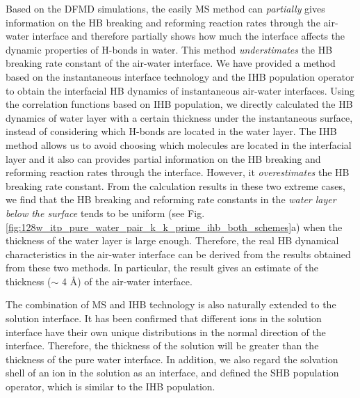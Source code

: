Based on the DFMD simulations, the easily MS method %
can \emph{partially} gives information on the HB breaking and reforming reaction
rates through the air-water interface and therefore partially shows how much the interface affects the dynamic properties of H-bonds in water. 
This method \emph{understimates} the HB breaking rate constant of the air-water interface. 
We have provided a method based on the instantaneous interface technology and the
IHB population operator to obtain the interfacial HB dynamics of instantaneous air-water interfaces.  
Using the correlation functions based on IHB population, we directly calculated the HB dynamics of water layer with a certain thickness 
under the instantaneous surface, instead of considering which H-bonds are located in the water layer. 
The IHB method allows us to avoid choosing which molecules are located in the interfacial layer and
it also can provides partial information on the HB breaking and reforming reaction rates through the interface. 
However, it \emph{overestimates} the HB breaking rate constant. From the calculation results in these two extreme cases, 
we find that the HB breaking and reforming rate constants in the \emph{water layer below the surface} tends to be uniform 
(see Fig.\ref{fig:128w_itp_pure_water_pair_k_k_prime_ihb_both_schemes}a) 
when the thickness of the water layer is large enough. Therefore, the real HB dynamical characteristics in the air-water interface 
can be derived from the results obtained from these two methods. 
In particular, the result gives an estimate of the thickness ($\sim$ 4 \AA) of the air-water interface.

The combination of MS and IHB technology is also naturally extended to the solution interface. 
It has been confirmed that different ions in the solution interface have their own unique distributions in the normal direction of the interface. 
Therefore, the thickness of the solution will be greater than the thickness of the pure water interface. 
In addition, we also regard the solvation shell of an ion in the solution as an interface, 
and defined the SHB population operator, which is similar to the IHB population.


